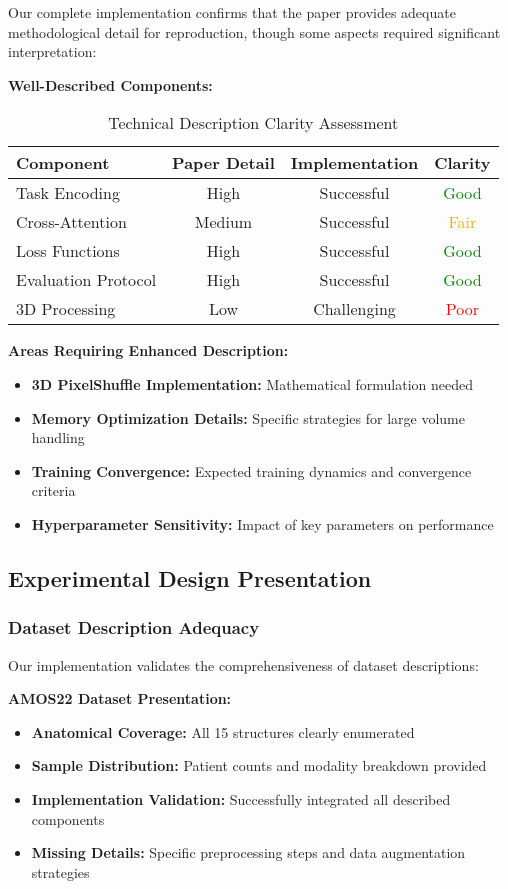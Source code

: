 Our complete implementation confirms that the paper provides adequate methodological detail for reproduction, though some aspects required significant interpretation:

\textbf{Well-Described Components:}
\begin{table}[h]
\centering
\small
\begin{tabular}{|l|c|c|c|}
\hline
\textbf{Component} & \textbf{Paper Detail} & \textbf{Implementation} & \textbf{Clarity} \\
\hline
Task Encoding & High & Successful & \textcolor{green}{Good} \\
Cross-Attention & Medium & Successful & \textcolor{orange}{Fair} \\
Loss Functions & High & Successful & \textcolor{green}{Good} \\
Evaluation Protocol & High & Successful & \textcolor{green}{Good} \\
3D Processing & Low & Challenging & \textcolor{red}{Poor} \\
\hline
\end{tabular}
\caption{Technical Description Clarity Assessment}
\label{tab:clarity_assessment}
\end{table}

\textbf{Areas Requiring Enhanced Description:}
\begin{itemize}
    \item \textbf{3D PixelShuffle Implementation:} Mathematical formulation needed
    \item \textbf{Memory Optimization Details:} Specific strategies for large volume handling
    \item \textbf{Training Convergence:} Expected training dynamics and convergence criteria
    \item \textbf{Hyperparameter Sensitivity:} Impact of key parameters on performance
\end{itemize}

\subsection{Experimental Design Presentation}

\subsubsection{Dataset Description Adequacy}
Our implementation validates the comprehensiveness of dataset descriptions:

\textbf{AMOS22 Dataset Presentation:}
\begin{itemize}
    \item \textbf{Anatomical Coverage:} All 15 structures clearly enumerated
    \item \textbf{Sample Distribution:} Patient counts and modality breakdown provided
    \item \textbf{Implementation Validation:} Successfully integrated all described components
    \item \textbf{Missing Details:} Specific preprocessing steps and data augmentation strategies
\end{itemize}

